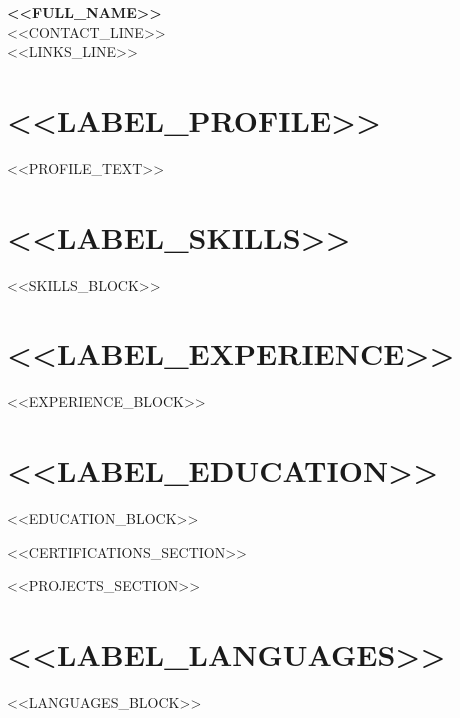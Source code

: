 \documentclass[a4paper,10pt]{article}
\begin{document}
\begin{center}
{\LARGE\bfseries <<FULL_NAME>>}\\[4pt]
<<CONTACT_LINE>>\\[2pt]
<<LINKS_LINE>>
\end{center}

\section{<<LABEL_PROFILE>>}
<<PROFILE_TEXT>>

\section{<<LABEL_SKILLS>>}
<<SKILLS_BLOCK>>

\section{<<LABEL_EXPERIENCE>>}
<<EXPERIENCE_BLOCK>>

\section{<<LABEL_EDUCATION>>}
<<EDUCATION_BLOCK>>

<<CERTIFICATIONS_SECTION>>

<<PROJECTS_SECTION>>

\section{<<LABEL_LANGUAGES>>}
<<LANGUAGES_BLOCK>>
\end{document}
